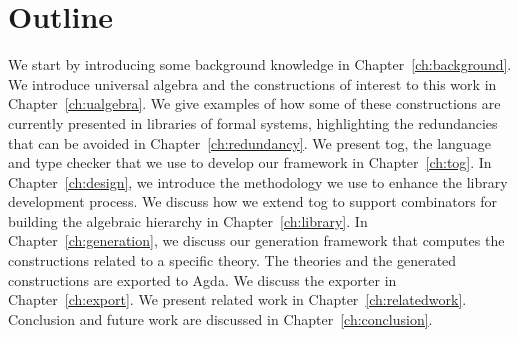 \section{Outline}
We start by introducing some background knowledge in Chapter~\ref{ch:background}. 
We introduce universal algebra and the constructions of interest to this work in Chapter~\ref{ch:ualgebra}. 
We give examples of how some of these constructions are currently presented in libraries of formal systems, highlighting the redundancies that can be avoided in Chapter~\ref{ch:redundancy}. 
We present tog, the language and type checker that we use to develop our framework in Chapter~\ref{ch:tog}. 
In Chapter~\ref{ch:design}, we introduce the methodology we use to enhance the library development process. 
We discuss how we extend tog to support combinators for building the algebraic hierarchy in Chapter~\ref{ch:library}. 
In Chapter~\ref{ch:generation}, we discuss our generation framework that computes the constructions related to a specific theory.  
The theories and the generated constructions are exported to Agda. We discuss the exporter in Chapter~\ref{ch:export}. 
We present related work in Chapter~\ref{ch:relatedwork}. Conclusion and future work are discussed in Chapter~\ref{ch:conclusion}. 

